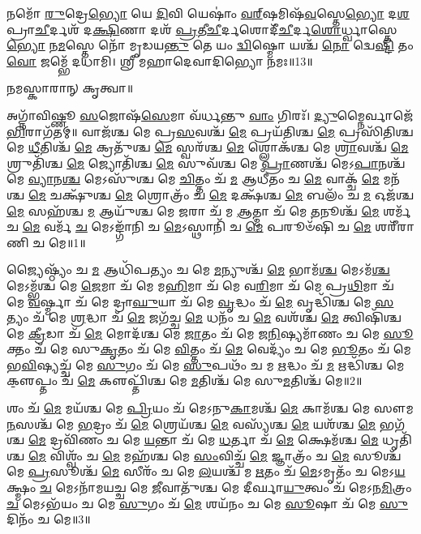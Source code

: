 𑌨𑌮𑍋᳴ \ul{𑌰𑍁}\-𑌦𑍍𑌰𑍇\-\ul{𑌭𑍍𑌯𑍋} 𑌯𑍇 \ul{𑌦𑌿}\-𑌵𑌿 𑌯𑍇𑌷𑌾𑌂॑ \ul{𑌵}\-\ul{𑌰𑍍}‌𑌷𑌮𑌿𑌷᳴\-\ul{𑌵}\-𑌸𑍍𑌤𑍇\-\ul{𑌭𑍍𑌯𑍋} 𑌦\-\ul{𑌶} 𑌪𑍍𑌰𑌾\-\ul{𑌚𑍀}\-𑌰𑍍𑌦𑌶᳴ 𑌦\-\ul{𑌕𑍍𑌷𑌿}\-𑌣𑌾 𑌦𑌶᳴ \ul{𑌪𑍍𑌰}\-𑌤𑍀\-\ul{𑌚𑍀}\-𑌰𑍍𑌦𑌶𑍋\-𑌦𑍀᳴\-\ul{𑌚𑍀}\-𑌰𑍍𑌦\-\ul{𑌶𑍋}\-𑌰𑍍𑌧𑍍𑌵𑌾𑌸𑍍𑌤𑍇\-\ul{𑌭𑍍𑌯𑍋} 𑌨\-\ul{𑌮}\-𑌸𑍍𑌤𑍇 𑌨𑍋᳴ 𑌮𑍃𑌡𑌯\-\ul{𑌨𑍍𑌤𑍁} 𑌤𑍇 𑌯𑌂 \ul{𑌦𑍍𑌵𑌿}\-𑌷𑍍𑌮𑍋 𑌯𑌶𑍍𑌚᳴ \ul{𑌨𑍋} 𑌦𑍍𑌵𑍇\-\ul{𑌷𑍍𑌟𑌿} 𑌤𑌂 \ul{𑌵𑍋} 𑌜𑌮𑍍𑌭𑍇᳴ 𑌦𑌧𑌾𑌮𑌿। 𑌶𑍍𑌰𑍀 𑌮𑌹𑌾𑌦𑍇𑌵𑌾𑌦𑌿𑌭𑍍𑌯𑍋 𑌨𑌮𑌃॥13॥ 

𑌨𑌮𑌸𑍍𑌕𑌾𑌰𑌾𑌨𑍍 𑌕𑍃𑌤𑍍𑌵𑌾॥

{\small \closesection}


𑌅𑌗𑍍𑌨𑌾᳴𑌵𑌿𑌷𑍍𑌣𑍂 \ul{𑌸}\-𑌜𑍋𑌷᳴\-\ul{𑌸𑍇}\-𑌮𑌾 𑌵᳴𑌰𑍍𑌧𑌨𑍍𑌤𑍁 \ul{𑌵𑌾𑌂} 𑌗𑌿𑌰𑌃᳴। \ul{𑌦𑍍𑌯𑍁}\-𑌮𑍍𑌨𑍈𑌰𑍍𑌵𑌾𑌜𑍇᳴\-\ul{𑌭𑌿}\-𑌰𑌾\-𑌗᳴𑌤𑌮𑍍॥ 
𑌵𑌾𑌜᳴𑌶𑍍𑌚 𑌮𑍇 𑌪𑍍𑌰\-\ul{𑌸}\-𑌵𑌶𑍍𑌚᳴ \ul{𑌮𑍇} 𑌪𑍍𑌰𑌯᳴𑌤𑌿𑌶𑍍𑌚 \ul{𑌮𑍇} 𑌪𑍍𑌰𑌸𑌿᳴𑌤𑌿𑌶𑍍𑌚 𑌮𑍇 \ul{𑌧𑍀}\-𑌤𑌿𑌶𑍍𑌚᳴ \ul{𑌮𑍇} 𑌕𑍍𑌰𑌤𑍁᳴𑌶𑍍𑌚 \ul{𑌮𑍇} 𑌸𑍍𑌵𑌰᳴𑌶𑍍𑌚 \ul{𑌮𑍇} 𑌶𑍍𑌲𑍋𑌕᳴𑌶𑍍𑌚 𑌮𑍇 \ul{𑌶𑍍𑌰𑌾}\-𑌵𑌶𑍍𑌚᳴ \ul{𑌮𑍇} 𑌶𑍍𑌰𑍁𑌤𑌿᳴𑌶𑍍𑌚 \ul{𑌮𑍇} 𑌜𑍍𑌯𑍋𑌤𑌿᳴𑌶𑍍𑌚 \ul{𑌮𑍇} 𑌸𑍁𑌵᳴𑌶𑍍𑌚 𑌮𑍇 \ul{𑌪𑍍𑌰𑌾}\-𑌣𑌶𑍍𑌚᳴ 𑌮𑍇𑌽\-\ul{𑌪𑌾}\-𑌨𑌶𑍍𑌚᳴ 𑌮𑍇 \ul{𑌵𑍍𑌯𑌾}\-𑌨\-\ul{𑌶𑍍𑌚} 𑌮𑍇𑌽𑌸𑍁᳴𑌶𑍍𑌚 𑌮𑍇 \ul{𑌚𑌿}\-𑌤𑍍𑌤𑌂 𑌚᳴ \ul{𑌮} 𑌆𑌧𑍀᳴𑌤𑌂 𑌚 \ul{𑌮𑍇} 𑌵𑌾𑌕𑍍𑌚᳴ \ul{𑌮𑍇} 𑌮𑌨᳴𑌶𑍍𑌚 \ul{𑌮𑍇} 𑌚𑌕𑍍𑌷𑍁᳴𑌶𑍍𑌚 \ul{𑌮𑍇} 𑌶𑍍𑌰𑍋𑌤𑍍𑌰𑌂᳴ 𑌚 \ul{𑌮𑍇} 𑌦𑌕𑍍𑌷᳴𑌶𑍍𑌚 \ul{𑌮𑍇} 𑌬𑌲𑌂᳴ 𑌚 \ul{𑌮} 𑌓𑌜᳴𑌶𑍍𑌚 \ul{𑌮𑍇} 𑌸𑌹᳴𑌶𑍍𑌚 \ul{𑌮} 𑌆𑌯𑍁᳴𑌶𑍍𑌚 𑌮𑍇 \ul{𑌜}\-𑌰𑌾 𑌚᳴ 𑌮 \ul{𑌆}\-𑌤𑍍𑌮𑌾 𑌚᳴ 𑌮𑍇 \ul{𑌤}\-𑌨𑍂𑌶𑍍𑌚᳴ \ul{𑌮𑍇} 𑌶𑌰𑍍𑌮᳴ 𑌚 \ul{𑌮𑍇} 𑌵𑌰𑍍𑌮᳴ \ul{𑌚} 𑌮𑍇𑌽𑌙𑍍𑌗𑌾᳴𑌨𑌿 𑌚 \ul{𑌮𑍇}\-𑌽𑌸𑍍𑌥𑌾𑌨𑌿᳴ 𑌚 \ul{𑌮𑍇} 𑌪𑌰𑍂𑍞᳴𑌷𑌿 𑌚 \ul{𑌮𑍇} 𑌶𑌰𑍀᳴𑌰𑌾𑌣𑌿 𑌚 𑌮𑍇॥1॥ 

𑌜𑍍𑌯𑍈𑌷𑍍𑌠𑍍𑌯𑌂᳴ 𑌚 \ul{𑌮} 𑌆𑌧𑌿᳴𑌪𑌤𑍍𑌯𑌂 𑌚 𑌮𑍇 \ul{𑌮}\-𑌨𑍍𑌯𑍁𑌶𑍍𑌚᳴ \ul{𑌮𑍇} 𑌭𑌾𑌮᳴\-\ul{𑌶𑍍𑌚} 𑌮𑍇𑌽𑌮᳴\-\ul{𑌶𑍍𑌚} 𑌮𑍇𑌽𑌮𑍍𑌭᳴𑌶𑍍𑌚 𑌮𑍇 \ul{𑌜𑍇}\-𑌮𑌾 𑌚᳴ 𑌮𑍇 𑌮\-\ul{𑌹𑌿}\-𑌮𑌾 𑌚᳴ 𑌮𑍇 𑌵\-\ul{𑌰𑌿}\-𑌮𑌾 𑌚᳴ 𑌮𑍇 𑌪𑍍𑌰\-\ul{𑌥𑌿}\-𑌮𑌾 𑌚᳴ 𑌮𑍇 \ul{𑌵}\-𑌰𑍍𑌷𑍍𑌮𑌾 𑌚᳴ 𑌮𑍇 𑌦𑍍𑌰𑌾\-\ul{𑌘𑍁}\-𑌯𑌾 𑌚᳴ 𑌮𑍇 \ul{𑌵𑍃}\-𑌦𑍍𑌧𑌂 𑌚᳴ \ul{𑌮𑍇} 𑌵𑍃𑌦𑍍𑌧𑌿᳴𑌶𑍍𑌚 𑌮𑍇 \ul{𑌸}\-𑌤𑍍𑌯𑌂 𑌚᳴ 𑌮𑍇 \ul{𑌶𑍍𑌰}\-𑌦𑍍𑌧𑌾 𑌚᳴ \ul{𑌮𑍇} 𑌜𑌗᳴𑌚𑍍𑌚 \ul{𑌮𑍇} 𑌧𑌨𑌂᳴ 𑌚 \ul{𑌮𑍇} 𑌵𑌶᳴𑌶𑍍𑌚 \ul{𑌮𑍇} 𑌤𑍍𑌵𑌿𑌷𑌿᳴𑌶𑍍𑌚 𑌮𑍇 \ul{𑌕𑍍𑌰𑍀}\-𑌡𑌾 𑌚᳴ \ul{𑌮𑍇} 𑌮𑍋𑌦᳴𑌶𑍍𑌚 𑌮𑍇 \ul{𑌜𑌾}\-𑌤𑌂 𑌚᳴ 𑌮𑍇 𑌜\-\ul{𑌨𑌿}\-𑌷𑍍𑌯𑌮𑌾᳴𑌣𑌂 𑌚 𑌮𑍇 \ul{𑌸𑍂}\-𑌕𑍍𑌤𑌂 𑌚᳴ 𑌮𑍇 𑌸𑍁\-\ul{𑌕𑍃}\-𑌤𑌂 𑌚᳴ 𑌮𑍇 \ul{𑌵𑌿}\-𑌤𑍍𑌤𑌂 𑌚᳴ \ul{𑌮𑍇} 𑌵𑍇𑌦𑍍𑌯𑌂᳴ 𑌚 𑌮𑍇 \ul{𑌭𑍂}\-𑌤𑌂 𑌚᳴ 𑌮𑍇 𑌭\-\ul{𑌵𑌿}\-𑌷𑍍𑌯𑌚𑍍𑌚᳴ 𑌮𑍇 \ul{𑌸𑍁}\-𑌗𑌂 𑌚᳴ 𑌮𑍇 \ul{𑌸𑍁}\-𑌪𑌥𑌂᳴ 𑌚 𑌮 \ul{𑌋}\-𑌦𑍍𑌧𑌂 𑌚᳴ \ul{𑌮} 𑌋𑌦𑍍𑌧𑌿᳴𑌶𑍍𑌚 𑌮𑍇 𑌕𑍢॒𑌪𑍍𑌤𑌂 𑌚᳴ \ul{𑌮𑍇} 𑌕𑍢𑌪𑍍𑌤𑌿᳴𑌶𑍍𑌚 𑌮𑍇 \ul{𑌮}\-𑌤𑌿𑌶𑍍𑌚᳴ 𑌮𑍇 𑌸𑍁\-\ul{𑌮}\-𑌤𑌿𑌶𑍍𑌚᳴ 𑌮𑍇॥2॥ 

𑌶𑌂 𑌚᳴ \ul{𑌮𑍇} 𑌮𑌯᳴𑌶𑍍𑌚 𑌮𑍇 \ul{𑌪𑍍𑌰𑌿}\-𑌯𑌂 𑌚᳴ 𑌮𑍇𑌽𑌨𑍁\-\ul{𑌕𑌾}\-𑌮𑌶𑍍𑌚᳴ \ul{𑌮𑍇} 𑌕𑌾𑌮᳴𑌶𑍍𑌚 𑌮𑍇 𑌸𑍗𑌮\-\ul{𑌨}\-𑌸𑌶𑍍𑌚᳴ 𑌮𑍇 \ul{𑌭}\-𑌦𑍍𑌰𑌂 𑌚᳴ \ul{𑌮𑍇} 𑌶𑍍𑌰𑍇𑌯᳴𑌶𑍍𑌚 \ul{𑌮𑍇} 𑌵𑌸𑍍𑌯᳴𑌶𑍍𑌚 \ul{𑌮𑍇} 𑌯𑌶᳴𑌶𑍍𑌚 \ul{𑌮𑍇} 𑌭𑌗᳴𑌶𑍍𑌚 \ul{𑌮𑍇} 𑌦𑍍𑌰𑌵𑌿᳴𑌣𑌂 𑌚 𑌮𑍇 \ul{𑌯}\-𑌨𑍍𑌤𑌾 𑌚᳴ 𑌮𑍇 \ul{𑌧}\-𑌰𑍍𑌤𑌾 𑌚᳴ \ul{𑌮𑍇} 𑌕𑍍𑌷𑍇𑌮᳴𑌶𑍍𑌚 \ul{𑌮𑍇} 𑌧𑍃𑌤𑌿᳴𑌶𑍍𑌚 \ul{𑌮𑍇} 𑌵𑌿𑌶𑍍𑌵𑌂᳴ 𑌚 \ul{𑌮𑍇} 𑌮𑌹᳴𑌶𑍍𑌚 𑌮𑍇 \ul{𑌸𑌂}\-𑌵𑌿𑌚𑍍𑌚᳴ \ul{𑌮𑍇} 𑌜𑍍𑌞𑌾𑌤𑍍𑌰𑌂᳴ 𑌚 \ul{𑌮𑍇} 𑌸𑍂𑌶𑍍𑌚᳴ 𑌮𑍇 \ul{𑌪𑍍𑌰}\-𑌸𑍂𑌶𑍍𑌚᳴ \ul{𑌮𑍇} 𑌸𑍀𑌰𑌂᳴ 𑌚 𑌮𑍇 \ul{𑌲}\-𑌯𑌶𑍍𑌚᳴ 𑌮 \ul{𑌋}\-𑌤𑌂 𑌚᳴ \ul{𑌮𑍇}\-𑌽𑌮𑍃𑌤𑌂᳴ 𑌚 𑌮𑍇𑌽\-\ul{𑌯}\-𑌕𑍍𑌷𑍍𑌮𑌂 \ul{𑌚} 𑌮𑍇𑌽𑌨𑌾᳴𑌮𑌯𑌚𑍍𑌚 𑌮𑍇 \ul{𑌜𑍀}\-𑌵𑌾𑌤𑍁᳴𑌶𑍍𑌚 𑌮𑍇 𑌦𑍀𑌰𑍍𑌘𑌾\-\ul{𑌯𑍁}\-𑌤𑍍𑌵𑌂 𑌚᳴ 𑌮𑍇𑌽𑌨\-\ul{𑌮𑌿}\-𑌤𑍍𑌰𑌂 \ul{𑌚} 𑌮𑍇𑌽𑌭᳴𑌯𑌂 𑌚 𑌮𑍇 \ul{𑌸𑍁}\-𑌗𑌂 𑌚᳴ \ul{𑌮𑍇} 𑌶𑌯᳴𑌨𑌂 𑌚 𑌮𑍇 \ul{𑌸𑍂}\-𑌷𑌾 𑌚᳴ 𑌮𑍇 \ul{𑌸𑍁}\-𑌦𑌿𑌨𑌂᳴ 𑌚 𑌮𑍇॥3॥ 

